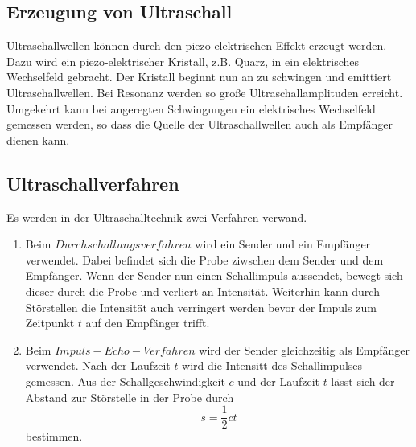 \subsection{Erzeugung von Ultraschall}
\label{sec:Ultraschall}
Ultraschallwellen können durch den piezo-elektrischen Effekt erzeugt werden. Dazu wird ein piezo-elektrischer
Kristall, z.B. Quarz, in ein elektrisches Wechselfeld gebracht. Der Kristall beginnt nun an zu schwingen und
emittiert Ultraschallwellen. Bei Resonanz werden so große Ultraschallamplituden erreicht.
Umgekehrt kann bei angeregten Schwingungen ein elektrisches Wechselfeld gemessen werden, so dass die Quelle
der Ultraschallwellen auch als Empfänger dienen kann.

\subsection{Ultraschallverfahren}
\label{sec:Ultraschallverfahren}
Es werden in der Ultraschalltechnik zwei Verfahren verwand.
\begin{enumerate}
    \item Beim $Durchschallungsverfahren$ wird ein Sender und ein Empfänger verwendet. Dabei befindet sich die
    Probe ziwschen dem Sender und dem Empfänger. Wenn der Sender nun einen Schallimpuls aussendet, bewegt sich
    dieser durch die Probe und verliert an Intensität. Weiterhin kann durch Störstellen die Intensität auch
    verringert werden bevor der Impuls zum Zeitpunkt $t$ auf den Empfänger trifft.
    \item Beim $Impuls-Echo-Verfahren$ wird der Sender gleichzeitig als Empfänger verwendet. Nach der Laufzeit
    $t$ wird die Intensitt des Schallimpulses gemessen. Aus der Schallgeschwindigkeit $c$ und der Laufzeit $t$
    lässt sich der Abstand zur Störstelle in der Probe durch
    \begin{equation}
        s = \frac{1}{2}ct
    \end{equation}
    bestimmen.
\end{enumerate}